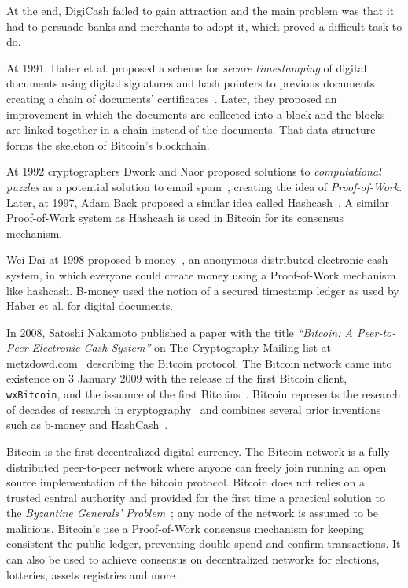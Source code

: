At the end, DigiCash failed to gain attraction and the main problem was that it had to persuade banks and merchants to adopt it, which proved a difficult task to do.

At 1991, Haber et al. proposed a scheme for \textit{secure timestamping} of digital documents using digital signatures and hash pointers to previous documents
creating a chain of documents' certificates~\cite{Haber1991}. Later, they proposed an improvement in which the documents are collected into a block and
the blocks are linked together in a chain instead of the documents. That data structure forms the skeleton of Bitcoin's blockchain.

At 1992 cryptographers Dwork and Naor proposed solutions to \textit{computational puzzles} as a potential solution to email spam~\cite{Dwork1993},
creating the idea of \textit{Proof-of-Work}. Later, at 1997, Adam Back proposed a similar idea called Hashcash~\cite{hash_cash}.
A similar Proof-of-Work system as Hashcash is used in Bitcoin for its consensus mechanism.

Wei Dai at 1998 proposed b-money~\cite{b_money}, an anonymous distributed electronic cash system, in which everyone could create money using a Proof-of-Work mechanism like hashcash. B-money used the notion of a secured timestamp ledger as used by Haber et al. for digital documents.

In 2008, Satoshi Nakamoto published a paper with the title \textit{``Bitcoin: A Peer-to-Peer Electronic Cash System''} on The Cryptography Mailing list at metzdowd.com~\cite{satoshi_mailing_list} describing the Bitcoin protocol. The Bitcoin network came into existence on 3 January 2009 with the release of the first Bitcoin client, \verb|wxBitcoin|, and the issuance of the first Bitcoins~\cite{btc_client, btc_first_block}. Bitcoin represents the research of decades of research in cryptography~\cite{antonopoulos2014mastering} and combines several prior inventions such as b-money and HashCash~\cite{antonopoulos2014mastering}.

Bitcoin is the first decentralized digital currency. The Bitcoin network is a fully distributed peer-to-peer network where anyone can freely join running an open source implementation of the bitcoin protocol. Bitcoin does not relies on a trusted central authority and provided for the first time a practical solution to the \textit{Byzantine Generals' Problem}~\cite{byzantine_fault_tolerance}; any node of the network is assumed to be malicious. Bitcoin's use a Proof-of-Work consensus mechanism for keeping consistent the public ledger, preventing double spend and confirm transactions. It can also be used to achieve consensus on decentralized networks for elections, lotteries, assets registries and more~\cite{antonopoulos2014mastering}.

